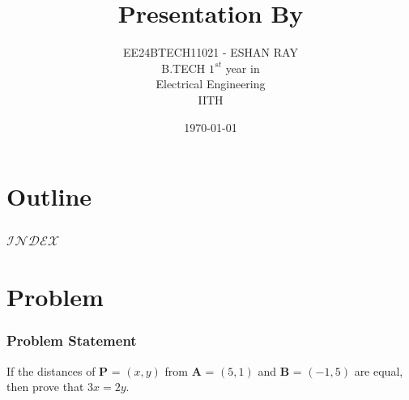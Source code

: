 \documentclass{beamer}
\title{Presentation By}
\author{EE24BTECH11021 - ESHAN RAY\\ B.TECH $1^{st}$ year in\\ Electrical Engineering\\ IITH}
\date{\today}
\providecommand{\brak}[1]{\ensuremath{\left(#1\right)}}
\theoremstyle{remark}
\newcommand{\myvec}[1]{\ensuremath{\begin{pmatrix}#1\end{pmatrix}}}
\let\vec\mathbf
\numberwithin{equation}{section}
\begin{document}
\begin{frame}
\titlepage
\end{frame}

\section*{Outline}
\begin{frame}
\frametitle{$\mathcal{INDEX}$}
\tableofcontents
\end{frame}
\section{Problem}
\begin{frame}
\frametitle{Problem Statement}
%
If the distances of $\vec P$ = \brak{x, y} from $\vec A$ = \brak{5, 1} and $\vec B$ = \brak{-1, 5} are equal, then prove that $3x = 2y$.
%

\end{frame}

\end{document}
